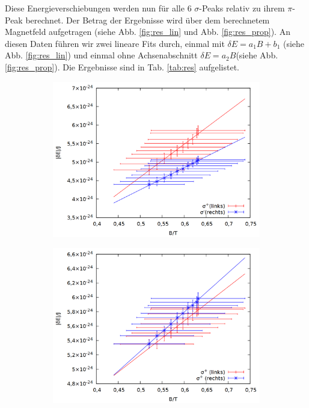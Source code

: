 Diese Energieverschiebungen werden nun für alle 6 $\sigma$-Peaks relativ zu ihrem $\pi$-Peak berechnet. Der Betrag der Ergebnisse wird über dem berechnetem Magnetfeld aufgetragen (siehe Abb. \ref{fig:res_lin} und Abb. \ref{fig:res_prop}). An diesen Daten führen wir zwei lineare Fits durch, einmal mit $\delta E = a_1 B + b_1$ (siehe Abb. \ref{fig:res_lin}) und einmal ohne Achsenabschnitt $\delta E = a_2 B$(siehe Abb. \ref{fig:res_prop}). Die Ergebnisse sind in Tab. \ref{tab:res} aufgelistet.\\
\begin{figure}
\centering
\begin{subfigure}{0.6\textwidth}
\includegraphics[width=\textwidth]{data/zeeman/out_zeeman_neu_links.png}
\end{subfigure}
\begin{subfigure}{0.6\textwidth}
\includegraphics[width=\textwidth]{data/zeeman/out_zeeman_neu_mitte.png}

\end{subfigure}
\end{figure}
